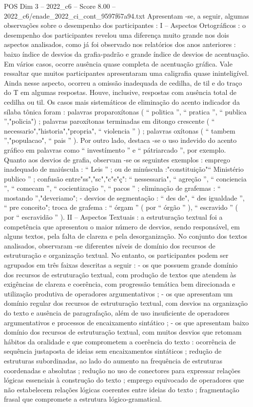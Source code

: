 \begin{textsample}{POS Dim 3 – 2022\_c6 – Score 8.00 – 2022\_c6/enade\_2022\_ci\_cont\_9597f67a94.txt}
Apresentam -se, a seguir, algumas observações sobre o desempenho dos participantes : I – Aspectos Ortográficos : o desempenho dos participantes revelou uma diferença muito grande nos dois aspectos analisados, como já foi observado nos relatórios dos anos anteriores : baixo índice de desvios da grafia-padrão e grande índice de desvios de acentuação.
Em vários casos, ocorre ausência quase completa de acentuação gráfica.
Vale ressaltar que muitos participantes apresentaram uma caligrafia quase ininteligível.
Ainda nesse aspecto, ocorreu a omissão inadequada de cedilha, de til e do traço do T em algumas respostas.
Houve, inclusive, respostas com ausência total de cedilha ou til.
Os casos mais sistemáticos de eliminação do acento indicador da sílaba tônica foram : palavras proparoxítonas ( “ politica ”, “ pratica ”, “ publica ”,"policia") ; palavras paroxítonas terminadas em ditongo crescente ( “ necessario","historia","propria", “ violencia ” ) ; palavras oxítonas ( “ tambem ”,"populacao", “ pais ” ).
Por outro lado, destaca -se o uso indevido do acento gráfico em palavras como “ investímento ” e “ pátriarcado ”, por exemplo.
Quanto aos desvios de grafia, observam -se os seguintes exemplos : emprego inadequado de maiúscula : “ Leis ” ; ou de minúscula :"constituição"“ Ministério publico ” ; confusão entre"ss","sc","c"e"ç": “ nessessaria", “ agreção ”, “ conciencia ”, “ comecam ”, “ cocientização ”, “ pacos ” ; eliminação de grafemas : “ mostando ”,"deveriamo"; - desvios de segmentação : “ des de", “ des igualdade ”, “ pre conceito"; troca de grafema : “ órgam ” ( por “ órgão ” ), “ escravido ” ( por “ escravidão ” ).
II – Aspectos Textuais : a estruturação textual foi a competência que apresentou o maior número de desvios, sendo responsável, em alguns textos, pela falta de clareza e pela desorganização.
No conjunto dos textos analisados, observaram -se diferentes níveis de domínio dos recursos de estruturação e organização textual.
No entanto, os participantes podem ser agrupados em três faixas descritas a seguir : - os que possuem grande domínio dos recursos de estruturação textual, com produção de textos que atendem às exigências de clareza e coerência, com progressão temática bem direcionada e utilização produtiva de operadores argumentativos ; - os que apresentam um domínio regular dos recursos de estruturação textual, com desvios na organização do texto e ausência de paragrafação, além de uso insuficiente de operadores argumentativos e processos de encaixamento sintático ; - os que apresentam baixo domínio dos recursos de estruturação textual, com muitos desvios que retomam hábitos da oralidade e que comprometem a coerência do texto : ocorrência de sequência justaposta de ideias sem encaixamentos sintáticos ; redução de estruturas subordinadas, ao lado do aumento na frequência de estruturas coordenadas e absolutas ; redução no uso de conectores para expressar relações lógicas essenciais à construção do texto ; emprego equivocado de operadores que não estabelecem relações lógicas coerentes entre ideias do texto ; fragmentação frasal que compromete a estrutura lógico-gramatical.

\end{textsample}
